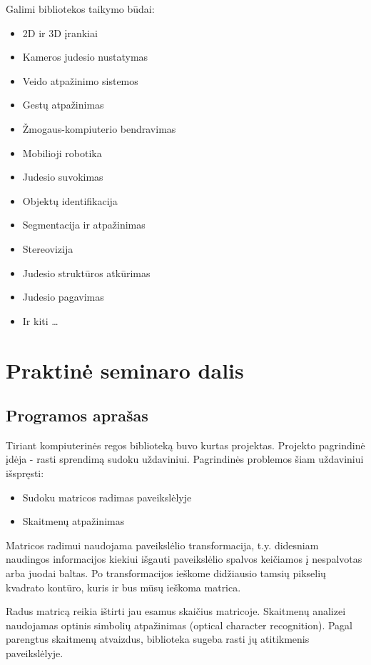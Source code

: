 \documentclass[a4paper,12pt]{article}
\begin{document}
Galimi bibliotekos taikymo būdai:
\begin{itemize}
    \item 2D ir 3D įrankiai
    \item Kameros judesio nustatymas
    \item Veido atpažinimo sistemos
    \item Gestų atpažinimas
    \item Žmogaus-kompiuterio bendravimas
    \item Mobilioji robotika
    \item Judesio suvokimas
    \item Objektų identifikacija
    \item Segmentacija ir atpažinimas
    \item Stereovizija
    \item Judesio struktūros atkūrimas
    \item Judesio pagavimas
    \item Ir kiti \ldots
\end{itemize}

\newpage

\section{Praktinė seminaro dalis}
\subsection{Programos aprašas}
Tiriant kompiuterinės regos biblioteką buvo kurtas projektas. Projekto pagrindinė įdėja - rasti sprendimą sudoku uždaviniui. Pagrindinės problemos šiam uždaviniui išspręsti:
\begin{itemize}
    \item Sudoku matricos radimas paveikslėlyje
    \item Skaitmenų atpažinimas
\end{itemize}

Matricos radimui naudojama paveikslėlio transformacija, t.y. didesniam naudingos informacijos kiekiui išgauti paveikslėlio spalvos keičiamos į nespalvotas arba juodai baltas. Po transformacijos ieškome didžiausio tamsių pikselių kvadrato kontūro, kuris ir bus mūsų ieškoma matrica.

Radus matricą reikia ištirti jau esamus skaičius matricoje. Skaitmenų analizei naudojamas optinis simbolių atpažinimas (optical character recognition). Pagal parengtus skaitmenų atvaizdus, biblioteka sugeba rasti jų atitikmenis paveikslėlyje.
\end{document}

